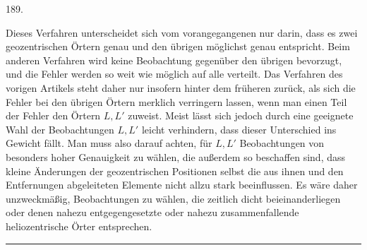 \begin{center}\hypertarget{native-262-article189}{}189.\end{center}
Dieses Verfahren unterscheidet sich vom vorangegangenen nur darin, dass
es zwei geozentrischen Örtern genau und den übrigen möglichst genau
entspricht. Beim anderen Verfahren wird keine Beobachtung gegenüber den
übrigen bevorzugt, und die Fehler werden so weit wie möglich auf alle
verteilt\rlap{\raisebox{1.4ex}{\rule{.6em}{.35pt}}}. Das Verfahren des vorigen
Artikels steht daher nur insofern hinter dem früheren zurück, als sich
die Fehler bei den übrigen Örtern merklich verringern lassen, wenn man
einen Teil der Fehler den Örtern $L,L'$ zuweist. Meist lässt sich jedoch
durch eine geeignete Wahl der Beobachtungen $L,L'$ leicht verhindern,
dass dieser Unterschied ins Gewicht fällt. Man muss also darauf
achten, für $L,L'$ Beobachtungen von besonders hoher Genauigkeit
zu wählen, die außerdem so beschaffen sind, dass kleine Änderungen der
geozentrischen Positionen selbst die aus ihnen und den Entfernungen
abgeleiteten Elemente nicht allzu stark beeinflussen. Es wäre daher
unzweckmäßig, Beobachtungen zu wählen, die zeitlich dicht beieinanderliegen
oder denen nahezu entgegengesetzte oder nahezu zusammenfallende
heliozentrische Örter entsprechen.
\begin{center}\rule{3cm}{.4pt}\end{center}
